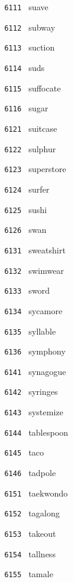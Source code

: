 \documentclass[11pt]{article}
\begin{document}
\begin{multicols}{6}
\footnotesize
\noindent \texttt{ 6111 } suave  \par
\noindent \texttt{ 6112 } subway  \par
\noindent \texttt{ 6113 } suction  \par
\noindent \texttt{ 6114 } suds  \par
\noindent \texttt{ 6115 } suffocate  \par
\noindent \texttt{ 6116 } sugar  \par
\vspace{3mm}
\noindent \texttt{ 6121 } suitcase  \par
\noindent \texttt{ 6122 } sulphur  \par
\noindent \texttt{ 6123 } superstore  \par
\noindent \texttt{ 6124 } surfer  \par
\noindent \texttt{ 6125 } sushi  \par
\noindent \texttt{ 6126 } swan  \par
\vspace{3mm}
\noindent \texttt{ 6131 } sweatshirt  \par
\noindent \texttt{ 6132 } swimwear  \par
\noindent \texttt{ 6133 } sword  \par
\noindent \texttt{ 6134 } sycamore  \par
\noindent \texttt{ 6135 } syllable  \par
\noindent \texttt{ 6136 } symphony  \par
\vspace{3mm}
\noindent \texttt{ 6141 } synagogue  \par
\noindent \texttt{ 6142 } syringes  \par
\noindent \texttt{ 6143 } systemize  \par
\noindent \texttt{ 6144 } tablespoon  \par
\noindent \texttt{ 6145 } taco  \par
\noindent \texttt{ 6146 } tadpole  \par
\vspace{3mm}
\noindent \texttt{ 6151 } taekwondo  \par
\noindent \texttt{ 6152 } tagalong  \par
\noindent \texttt{ 6153 } takeout  \par
\noindent \texttt{ 6154 } tallness  \par
\noindent \texttt{ 6155 } tamale  \par

\end{multicols}
\end{document}
